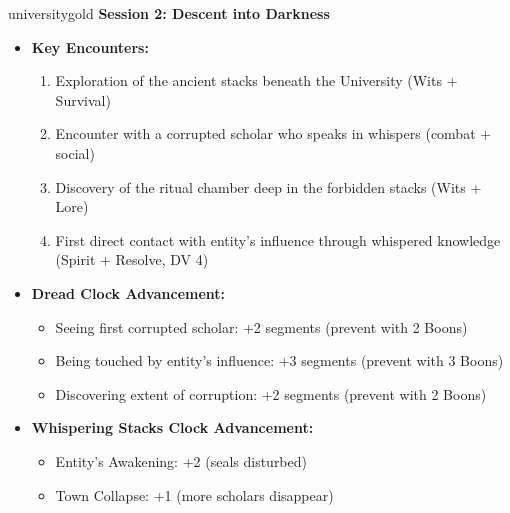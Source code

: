 \documentclass[11pt]{article}
\begin{document}
\begin{campaignsection}{universitygold}
\textbf{Session 2: Descent into Darkness}
\begin{itemize}
    \item \textbf{Key Encounters:}
    \begin{enumerate}
        \item Exploration of the ancient stacks beneath the University (Wits + Survival)
        \item Encounter with a corrupted scholar who speaks in whispers (combat + social)
        \item Discovery of the ritual chamber deep in the forbidden stacks (Wits + Lore)
        \item First direct contact with entity's influence through whispered knowledge (Spirit + Resolve, DV 4)
    \end{enumerate}
    \item \textbf{Dread Clock Advancement:}
    \begin{itemize}
        \item Seeing first corrupted scholar: +2 segments (prevent with 2 Boons)
        \item Being touched by entity's influence: +3 segments (prevent with 3 Boons)
        \item Discovering extent of corruption: +2 segments (prevent with 2 Boons)
    \end{itemize}
    \item \textbf{Whispering Stacks Clock Advancement:}
    \begin{itemize}
        \item Entity's Awakening: +2 (seals disturbed)
        \item Town Collapse: +1 (more scholars disappear)
    \end{itemize}
\end{itemize}


\end{campaignsection}
\end{document}
